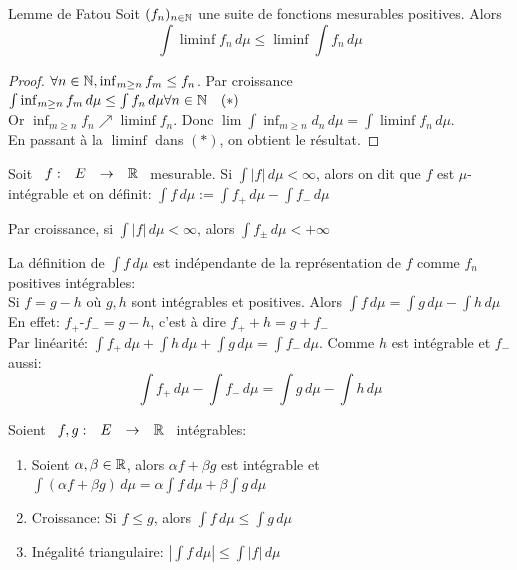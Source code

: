 \documentclass[]{report}
\begin{document}
    \begin{lm}{Lemme de Fatou}{}
        Soit $(f_n)_{n\in\mathbb{N}}$ une suite de fonctions mesurables positives. Alors
        \[\int \liminf f_n\,d\mu\le \liminf\int f_n\,d\mu\]
    \end{lm}

    \begin{proof}{}{}
        $\forall n\in \mathbb{N},\inf_{m\ge n}f_m\le f_n$. Par croissance $\int \inf_{m\ge n}f_m\,d\mu \le\int f_n\,d\mu\forall n\in \mathbb{N} \quad(*)$\\
        Or $\inf_{m\ge n}f_n\nearrow \liminf f_n$. Donc $\lim \int \inf_{m\ge n}d_n\,d\mu=\int\liminf f_n\,d\mu$.\\
        En passant à la $\liminf$ dans $(*)$, on obtient le résultat.
    \end{proof}

    \begin{df}{}{}
        Soit $\begin{array}{ccccc} f : & E & \to & \mathbb{R} \end{array}$ mesurable. Si $\int|f|\,d\mu<\infty$, alors on dit que $f$ est $\mu$-intégrable et on définit: $\int f\,d\mu:=\int f_+\,d\mu-\int f_-\,d\mu$
    \end{df}

    \begin{re}{}{}
        Par croissance, si $\int|f|\,d\mu<\infty$, alors $\int f_{\pm}\,d\mu<+\infty$
    \end{re}

    \begin{re}{}{}
        La définition de $\int f\,d\mu$ est indépendante de la représentation de $f$ comme $f_n$ positives intégrables:\\
        Si $f=g-h$ où $g,h$ sont intégrables et positives. Alors $\int f\,d\mu=\int g\,d\mu-\int h\,d\mu$\\
        En effet: $f_+$-$f_-=g-h$, c'est à dire $f_++h=g+f_-$\\
        Par linéarité: $\int f_+\,d\mu+\int h\,d\mu+\int g\,d\mu=\int f_-\,d\mu$. Comme $h$ est intégrable et $f_-$ aussi:
        \[\int f_+\,d\mu-\int f_-\,d\mu=\int g\,d\mu-\int h\,d\mu\]
    \end{re}

    \begin{prop}{}{}
        Soient $\begin{array}{ccccc} f,g : & E & \to & \mathbb{R} \end{array}$ intégrables:
        \begin{enumerate}
            \item Soient $\alpha,\beta\in \mathbb{R}$, alors $\alpha f+\beta g$ est intégrable et $\int (\alpha f+\beta g)\,d\mu=\alpha \int f\,d\mu+\beta\int g\,d\mu$
            \item Croissance: Si $f\le g$, alors $\int f\,d\mu\le \int g\,d\mu$
            \item Inégalité triangulaire: $|\int f\,d\mu|\le \int |f|\,d\mu$
        \end{enumerate}
    \end{prop}
\end{document}
